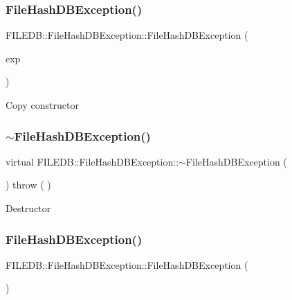 \subsubsection{\texorpdfstring{FileHashDBException()}{FileHashDBException()}\hspace{0.1cm}{\footnotesize\ttfamily [5/6]}}
{\footnotesize\ttfamily F\+I\+L\+E\+D\+B\+::\+File\+Hash\+D\+B\+Exception\+::\+File\+Hash\+D\+B\+Exception (\begin{DoxyParamCaption}\item[{const \mbox{\hyperlink{classFILEDB_1_1FileHashDBException}{File\+Hash\+D\+B\+Exception}} \&}]{exp }\end{DoxyParamCaption})}

Copy constructor \mbox{\label{classFILEDB_1_1FileHashDBException_aacf132dca5ed0d1b8dc3e4694c77c190}} 
\subsubsection{\texorpdfstring{$\sim$FileHashDBException()}{~FileHashDBException()}\hspace{0.1cm}{\footnotesize\ttfamily [2/2]}}
{\footnotesize\ttfamily virtual F\+I\+L\+E\+D\+B\+::\+File\+Hash\+D\+B\+Exception\+::$\sim$\+File\+Hash\+D\+B\+Exception (\begin{DoxyParamCaption}\item[{void}]{ }\end{DoxyParamCaption}) throw ( ) \hspace{0.3cm}{\ttfamily [virtual]}}

Destructor \mbox{\label{classFILEDB_1_1FileHashDBException_a7cbe99c797d9edf2d2e123d3aacaba76}} 
\subsubsection{\texorpdfstring{FileHashDBException()}{FileHashDBException()}\hspace{0.1cm}{\footnotesize\ttfamily [6/6]}}
{\footnotesize\ttfamily F\+I\+L\+E\+D\+B\+::\+File\+Hash\+D\+B\+Exception\+::\+File\+Hash\+D\+B\+Exception (\begin{DoxyParamCaption}\item[{void}]{ }\end{DoxyParamCaption})\hspace{0.3cm}{\ttfamily [protected]}}




